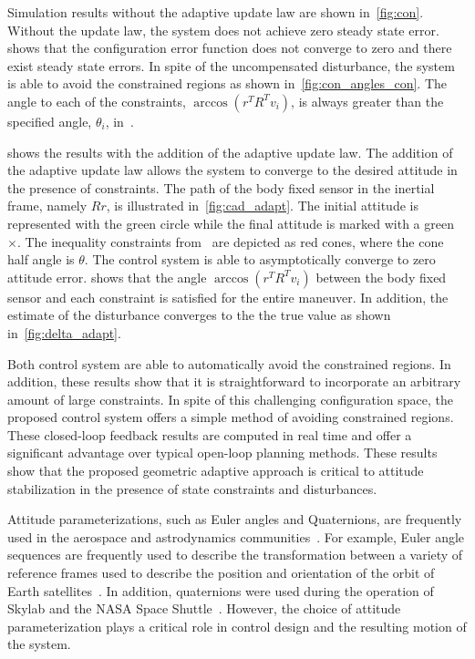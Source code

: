 \documentclass[fleqn]{IJCAS}  %
\begin{document}
\begin{multicols}{2}
Simulation results without the adaptive update law are shown in~\cref{fig:con}.
Without the update law, the system does not achieve zero steady state error. 
 shows that the configuration error function does not converge to zero and there exist steady state errors.
In spite of the uncompensated disturbance, the system is able to avoid the constrained regions as shown in~\cref{fig:con_angles_con}.
The angle to each of the constraints,  \( \arccos(r^T R^T v_i) \), is always greater than the specified angle, \( \theta_i \), in~.

 shows the results with the addition of the adaptive update law.
The addition of the adaptive update law allows the system to converge to the desired attitude in the presence of constraints.
The path of the body fixed sensor in the inertial frame, namely \( R r \), is illustrated in~\cref{fig:cad_adapt}.
The initial attitude is represented with the green circle while the final attitude is marked with a green \(\times\).
The inequality constraints from~ are depicted as red cones, where the cone half angle is \( \theta \).
The control system is able to asymptotically converge to zero attitude error.
 shows that the angle \( \arccos(r^T R^T v_i) \) between the body fixed sensor and each constraint is satisfied for the entire maneuver.
In addition, the estimate of the disturbance converges to the the true value as shown in~\cref{fig:delta_adapt}.

Both control system are able to automatically avoid the constrained regions. 
In addition, these results show that it is straightforward to incorporate an arbitrary amount of large constraints.
In spite of this challenging configuration space, the proposed control system offers a simple method of avoiding constrained regions.
These closed-loop feedback results are computed in real time and offer a significant advantage over typical open-loop planning methods.
These results show that the proposed geometric adaptive approach is critical to attitude stabilization in the presence of state constraints and disturbances.

Attitude parameterizations, such as Euler angles and Quaternions, are frequently used in the aerospace and astrodynamics communities~\cite{vallado2001,bate1971,wertz1978}.
For example, Euler angle sequences are frequently used to describe the transformation between a variety of reference frames used to describe the position and orientation of the orbit of Earth satellites~\cite{vallado2001}.
In addition, quaternions were used during the operation of Skylab and the NASA Space Shuttle~\cite{hughes2004}.
However, the choice of attitude parameterization plays a critical role in control design and the resulting motion of the system.


\end{multicols}
\end{document}
